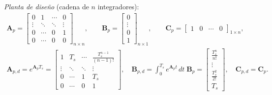 \textit{Planta de diseño} (cadena de $n$ integradores):
\begin{equation}
\begin{gathered}
\mathbf{A}_p =
\begin{bmatrix} 0 & 1 & \cdots & 0 \\ \vdots & \ddots & \ddots & \vdots \\ 0 & \cdots & 0 & 1 \\ 0 & \cdots & 0 & 0 \end{bmatrix}_{n \times n},
\qquad
\mathbf{B}_p = \begin{bmatrix} 0 \\ \vdots \\ 0 \\ 1 \end{bmatrix}_{n \times 1},
\qquad
\mathbf{C}_p = \begin{bmatrix} 1 & 0 & \cdots & 0 \end{bmatrix}_{1 \times n},
\\[8pt]
\mathbf{A}_{p,d} = e^{\mathbf{A}_p T_s} =
\begin{bmatrix} 1 & T_s & \cdots & \frac{T_s^{n-1}}{(n-1)!} \\ \vdots & \ddots & \ddots & \vdots \\ 0 & \cdots & 1 & T_s \\ 0 & \cdots & 0 & 1 \end{bmatrix},
\quad
\mathbf{B}_{p,d} = \int_0^{T_s} e^{\mathbf{A}_p t}\,dt\;\mathbf{B}_p =
\begin{bmatrix} \frac{T_s^{n}}{n!} \\ \vdots \\ \frac{T_s^{2}}{2!} \\ T_s \end{bmatrix},
\quad
\mathbf{C}_{p,d} = \mathbf{C}_p .
\end{gathered}
\label{eq:disc_planta}
\end{equation}

